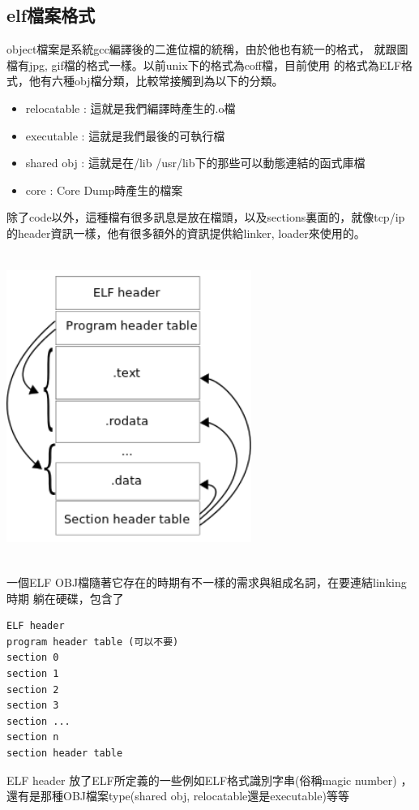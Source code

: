     \subsection{elf檔案格式}
    object檔案是系統gcc編譯後的二進位檔的統稱，由於他也有統一的格式，
    就跟圖檔有jpg, gif檔的格式一樣。以前unix下的格式為coff檔，目前使用
    的格式為ELF格式，他有六種obj檔分類，比較常接觸到為以下的分類。
    \begin{itemize}
      \item relocatable :  這就是我們編譯時產生的.o檔
      \item executable  :  這就是我們最後的可執行檔
      \item shared obj  :  這就是在/lib /usr/lib下的那些可以動態連結的函式庫檔
      \item core        :  Core Dump時產生的檔案
    \end{itemize}
    除了code以外，這種檔有很多訊息是放在檔頭，以及sections裏面的，就像tcp/ip
    的header資訊一樣，他有很多額外的資訊提供給linker, loader來使用的。
    \begin{center}
    \includegraphics[width=8cm,height=10cm]{images/elf.png}
    \end{center}
    一個ELF OBJ檔隨著它存在的時期有不一樣的需求與組成名詞，在要連結linking時期
    躺在硬碟，包含了
    \begin{verbatim}
ELF header
program header table (可以不要)
section 0
section 1
section 2
section 3
section ...
section n
section header table
    \end{verbatim}
    ELF header 放了ELF所定義的一些例如ELF格式識別字串(俗稱magic number)
    ，還有是那種OBJ檔案type(shared obj, relocatable還是executable)等等
